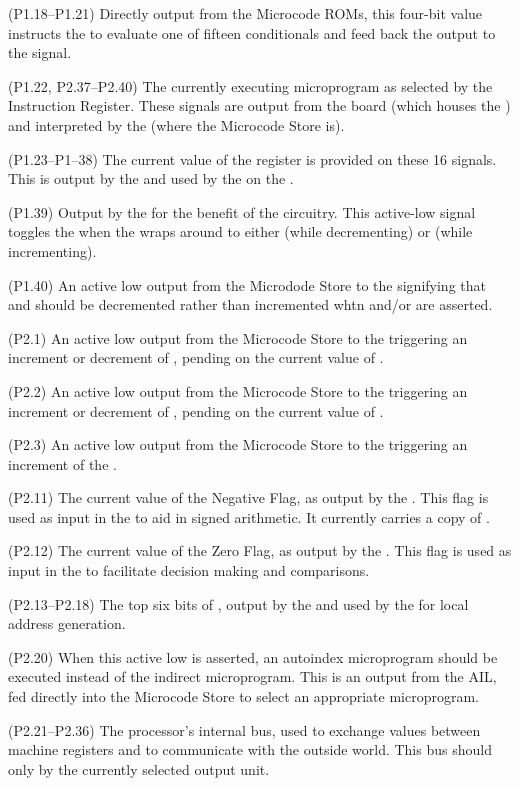 \begin{description}
 (P1.18–P1.21) Directly output from the
Microcode ROMs, this four-bit value instructs the \SBU{} to evaluate
one of fifteen conditionals and feed back the output to the \SKIP
signal.

 (P1.22, P2.37–P2.40) The currently executing microprogram
  as selected by the Instruction Register. These signals are output from the
   board (which houses the \IR) and interpreted by the 
  (where the Microcode Store is).

 (P1.23–P1–38) The current value of the \AC{}
  register is provided on these 16 signals. This is output by the
   and used by the \ALU on the .

\li{\ACCPL} (P1.39) Output by the  for the benefit of the
\Lreg{} circuitry. This active-low signal toggles the \Lreg{} when the
\AC{} wraps around to either  (while decrementing) or
 (while incrementing).

\li{\DEC} (P1.40) An active low output from the Microdode Store to the
 signifying that \AC{} and \DR{} should be decremented
rather than incremented whtn \STPAC{} and/or \STPDR{} are asserted.


\li{\STPAC} (P2.1) An active low output from the Microcode Store to
the  triggering an increment or decrement of \AC{}, pending
on the current value of \DEC.

\li{\STPDR} (P2.2) An active low output from the Microcode Store to
the  triggering an increment or decrement of \DR{}, pending
on the current value of \DEC.

\li{\INCPC} (P2.3) An active low output from the Microcode Store to
the  triggering an increment of the \PC{}.

\li{\FNEG} (P2.11) The current value of the Negative Flag, as output
by the . This flag is used as input in the \SBU to aid in signed
arithmetic. It currently carries a copy of .

\li{\FZERO} (P2.12) The current value of the Zero Flag, as output by
the . This flag is used as input in the \SBU to facilitate
decision making and comparisons.

 (P2.13–P2.18) The top six bits of \PC{}, output
by the  and used by the \AGL{} for local address
generation.

\li{\AINDEX} (P2.20) When this active low is asserted, an autoindex
microprogram should be executed instead of the indirect
microprogram. This is an output from the \unit{AIL}, fed directly into
the Microcode Store to select an appropriate microprogram.

 (P2.21–P2.36) The processor's internal bus,
  used to exchange values between machine registers and to communicate
  with the outside world. This bus should only by the currently
  selected output unit.

\end{description}


